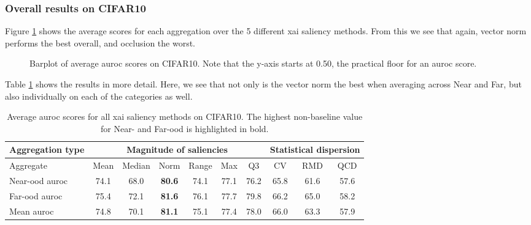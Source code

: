 \documentclass[UKenglish]{uiomasterthesis} %
\theoremstyle{definition}
\begin{document}
\subsubsection{Overall results on CIFAR10} \label{section:salagg_val_cifar10}

Figure \ref{fig:cifar10_all_metrics_barplot} shows the average scores for each aggregation over the 5 different \ac{xai} saliency methods. From this we see that again, vector norm performs the best overall, and occlusion the worst. 

\begin{figure}[H]
    \begin{center}
        
    \end{center}
    \caption[Average scores]{Barplot of average \ac{auroc} scores on CIFAR10. Note that the y-axis starts at 0.50, the practical floor for an \ac{auroc} score.}
    \label{fig:cifar10_all_metrics_barplot}
\end{figure}

Table \ref{table:cifar10_all_metrics} shows the results in more detail. Here, we see that not only is the vector norm the best when averaging across Near and Far, but also individually on each of the categories as well.

\begin{table}[H]
\setlength\tabcolsep{3pt}
\begin{center}
\begin{tabular}{ |p{5.1em}|c c c c c c|c c c| }
    \hline
     \centering Aggregation type & \multicolumn{6}{c|}{Magnitude of saliencies} & \multicolumn{3}{p{8em}|}{\centering Statistical dispersion} \\
    \hline
    Aggregate & Mean & Median & Norm & Range & Max & Q3 & CV & RMD & QCD  \\
    \hline
    \rowcolor{near!50}
    Near-\ac{ood} \ac{auroc} & 74.1 & 68.0 &\textbf{ 80.6 }& 74.1 & 77.1 & 76.2 & 65.8 & 61.6 & 57.6  \\
    \hline
    \rowcolor{far!50}
    Far-\ac{ood} \ac{auroc} & 75.4 & 72.1 &\textbf{ 81.6 }& 76.1 & 77.7 & 79.8 & 66.2 & 65.0 & 58.2  \\
    \hline
    Mean \ac{auroc} & 74.8 & 70.1 &\textbf{ 81.1 }& 75.1 & 77.4 & 78.0 & 66.0 & 63.3 & 57.9  \\
    \hline
    \end{tabular}
    \caption[Average \ac{auroc} scores over all \ac{xai} saliency methods on CIFAR10]{Average \ac{auroc} scores for all \ac{xai} saliency methods on CIFAR10. The highest non-baseline value for Near- and Far-\ac{ood} is highlighted in bold. }
    \label{table:cifar10_all_metrics}
\end{center}
\setlength\tabcolsep{6pt}
\end{table}
\end{document}
